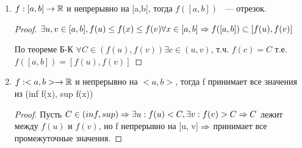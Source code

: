 \begin{conseq}{}
   \begin{enumerate}
       \item $f:[a,b] \to \mathbb{R}$ и непрерывно на [a,b], тогда $f([a, b])$ ~--- отрезок.
       \begin{proof}
          $\exists u, v \in [a, b], f(u) \le f(x) \le f(v) \forall x \in [a, b] \Rightarrow f([a, b]) \subset [f(u), f(v)]$

          По теореме Б-К $\forall C \in (f(u), f(v)) \exists c \in (u, v)$, т.ч. $f(c) = C$ т.е. $f([a, b]) = [f(u), f(v)]$
       \end{proof}
       \item $f:<a, b> \to \mathbb{R}$  и непрерывно на $<a, b>$, тогда f принимает все значения из (inf f(x), sup f(x))
       \begin{proof}
          Пусть $C \in (inf, sup) \Rightarrow \exists u:f(u) < C, \exists v:f(v) > C \Rightarrow C$ лежит между $f(u)$ и $f(v)$, но f непрерывно на [u, v] $\Rightarrow$ принимает все промежуточные значения.
       \end{proof}
   \end{enumerate}

\end{conseq}


                                        